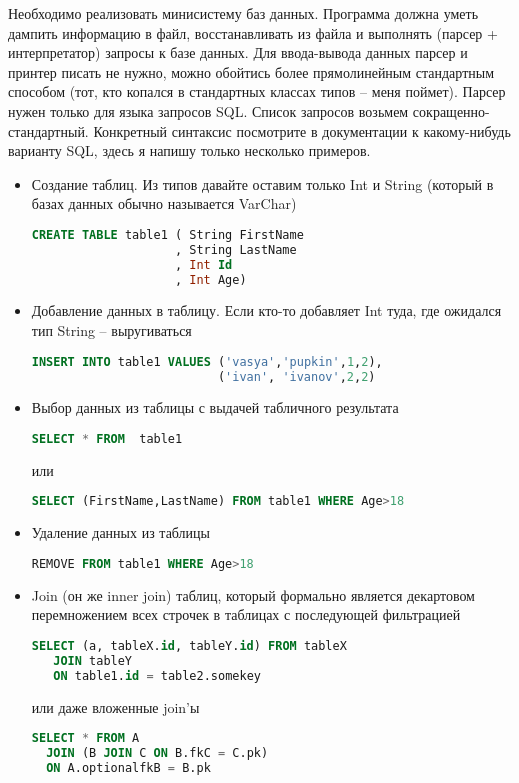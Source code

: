 \documentclass[a4paper,14pt]{article}
\begin{document}
Необходимо реализовать минисистему баз данных. Программа должна уметь дампить информацию в файл, восстанавливать из файла и выполнять (парсер + интерпретатор) запросы к базе данных. Для ввода-вывода данных парсер и принтер писать не нужно, можно обойтись более прямолинейным стандартным способом (тот, кто копался в стандартных классах типов -- меня поймет). Парсер нужен только для языка запросов SQL. Список запросов возьмем сокращенно-стандартный. Конкретный синтаксис посмотрите в документации к какому-нибудь варианту SQL, здесь я напишу только несколько примеров.

\begin{itemize}
 \item Создание таблиц. Из типов давайте оставим только Int и String (который в базах данных обычно называется VarChar)
\begin{lstlisting}[language=sql]
CREATE TABLE table1 ( String FirstName
                    , String LastName
                    , Int Id
                    , Int Age)
\end{lstlisting}
\item  Добавление данных в таблицу. Если кто-то добавляет Int туда, где ожидался тип String -- выругиваться
\begin{lstlisting}[language=sql]
INSERT INTO table1 VALUES ('vasya','pupkin',1,2), 
                          ('ivan', 'ivanov',2,2)
\end{lstlisting}
\item Выбор данных из таблицы с выдачей табличного результата
\begin{lstlisting}[language=sql]
SELECT * FROM  table1
\end{lstlisting} 
или 
\begin{lstlisting}[language=sql]
SELECT (FirstName,LastName) FROM table1 WHERE Age>18
\end{lstlisting}
 
\item Удаление данных из таблицы
\begin{lstlisting}[language=sql]
REMOVE FROM table1 WHERE Age>18
\end{lstlisting}
\item Join (он же inner join) таблиц, который формально является декартовом перемножением всех строчек в таблицах с последующей фильтрацией
\begin{lstlisting}[language=sql]
SELECT (a, tableX.id, tableY.id) FROM tableX 
   JOIN tableY 
   ON table1.id = table2.somekey
\end{lstlisting}
или даже вложенные join'ы
\begin{lstlisting}[language=sql]
SELECT * FROM A
  JOIN (B JOIN C ON B.fkC = C.pk) 
  ON A.optionalfkB = B.pk
\end{lstlisting}
\end{itemize}
\end{document}

